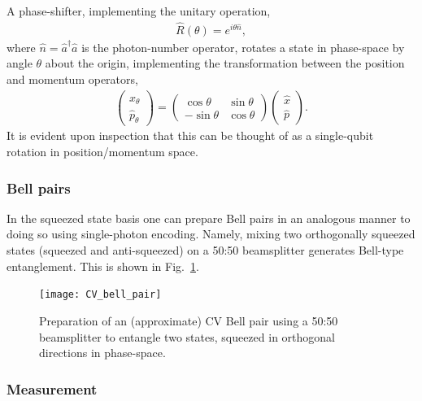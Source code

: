 A phase-shifter, implementing the unitary operation,
\begin{align}
\hat{R}(\theta) = e^{i\theta \hat{n}},
\end{align}
where \mbox{$\hat{n}=\hat a^\dag \hat a$} is the photon-number operator, rotates a state in phase-space by angle $\theta$ about the origin, implementing the transformation between the position and momentum operators,
\begin{align}\label{eq:xp_theta}
\begin{pmatrix}
\hat x_{\theta}\\
\hat p_{\theta}
\end{pmatrix}
=
\begin{pmatrix}
\cos\theta & \sin\theta \\
-\sin\theta & \cos\theta
\end{pmatrix}
\begin{pmatrix}
\hat x\\
\hat p
\end{pmatrix}.
\end{align}
It is evident upon inspection that this can be thought of as a single-qubit rotation in position/momentum space.

%
%

\subsubsection{Bell pairs}\label{sec:CV_bell_pairs}

In the squeezed state basis one can prepare Bell pairs in an analogous manner to doing so using single-photon encoding. Namely, mixing two orthogonally squeezed states (squeezed and anti-squeezed) on a 50:50 beamsplitter generates Bell-type entanglement. This is shown in Fig.~\ref{fig:CV_bell_pair}.

\begin{figure}[!htbp]
\texttt{[image: CV\_bell\_pair]}
\captionspacefig \caption{Preparation of an (approximate) CV Bell pair using a 50:50 beamsplitter to entangle two states, squeezed in orthogonal directions in phase-space.}\label{fig:CV_bell_pair}	
\end{figure}

%
%

\subsubsection{Measurement}

